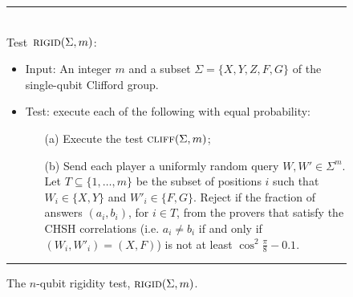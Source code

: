 \begin{figure}[H]
\rule[1ex]{\textwidth}{0.5pt}\\
Test~$\textsc{rigid}(\Sigma,m)$:
\begin{itemize}
    \item Input: An integer $m$ and a subset $\Sigma = \{X,Y,Z,F,G\}$ of the single-qubit Clifford group. 
    \item Test: execute each of the following with equal probability:
\begin{enumerate}
\item[(a)] Execute the test $\textsc{cliff}(\Sigma,m)$;
\item[(b)] Send each player a uniformly random query $W,W'\in \Sigma^m$. Let $T \subseteq \{1,\ldots,m\}$ be the subset of positions $i$ such that $W_i \in \{X,Y\}$ and $W'_i\in\{F,G\}$. Reject if the fraction of answers $(a_i,b_i)$, for $i\in T$, from the provers that satisfy the CHSH correlations (i.e. $a_i\neq b_i$ if and only if $(W_i,W'_i)=(X,F)$) is not at least $\cos^2 \frac{\pi}{8} - 0.1$.
\end{enumerate}
\end{itemize}
\rule[2ex]{\textwidth}{0.5pt}\vspace{-.5cm}
\caption{The $n$-qubit rigidity test, $\textsc{rigid}(\Sigma,m)$.}
\label{fig:rigid}
\end{figure}



%

